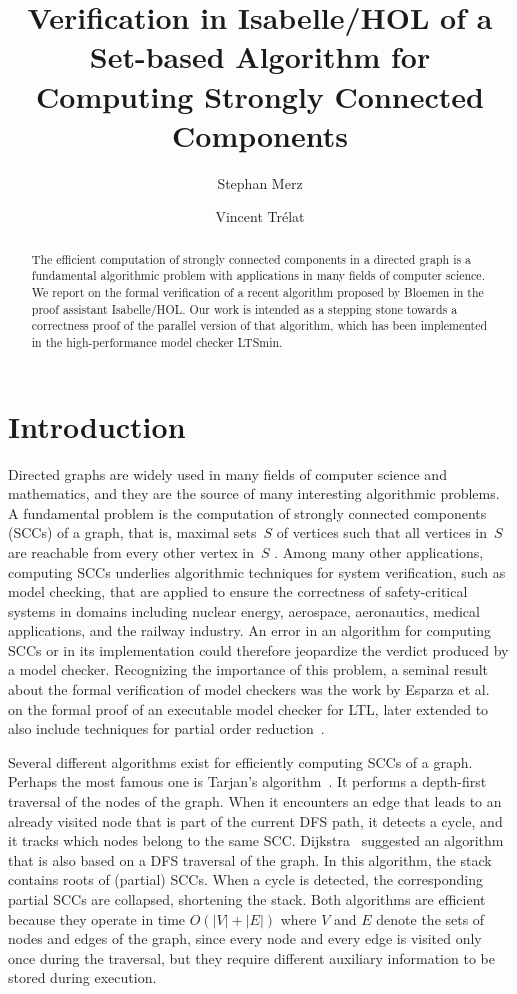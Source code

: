 \documentclass[sigplan,10pt,anonymous,review]{acmart}
\title{Verification in Isabelle/HOL of a Set-based Algorithm for Computing Strongly Connected Components}
\author{Stephan Merz}
\affiliation{
  \institution{University of Lorraine, CNRS, Inria, LORIA}
  \city{Nancy}
  \country{France}
}
\author{Vincent Trélat}
\affiliation{
  \institution{University of Lorraine}
  \city{Nancy}
  \country{France}
}
\begin{document}
\begin{abstract}
  The efficient computation of strongly connected components in a directed graph is a fundamental algorithmic problem with applications in many fields of computer science. We report on the formal verification of a recent algorithm proposed by Bloemen in the proof assistant Isabelle/HOL. Our work is intended as a stepping stone towards a correctness proof of the parallel version of that algorithm, which has been implemented in the high-performance model checker LTSmin.
\end{abstract}

\maketitle

\section{Introduction}
\label{sec:introduction}

Directed graphs are widely used in many fields of computer science and mathematics, and they are the source of many interesting algorithmic problems. A fundamental problem is the computation of strongly connected components (SCCs) of a graph, that is, maximal sets~$S$ of vertices such that all vertices in~$S$ are reachable from every other vertex in~$S$ \cite[Chap.~4.2]{sedgewick:algorithms}. Among many other applications, computing SCCs underlies algorithmic techniques for system verification, such as model checking, that are applied to ensure the correctness of safety-critical systems in domains including nuclear energy, aerospace, aeronautics, medical applications, and the railway industry. An error in an algorithm for computing SCCs or in its implementation could therefore jeopardize the verdict produced by a model checker. Recognizing the importance of this problem, a seminal result about the formal verification of model checkers was the work by Esparza et al.~\cite{esparza:cava} on the formal proof of an executable model checker for LTL, later extended to also include techniques for partial order reduction~\cite{brunner:partial-order}.

Several different algorithms exist for efficiently computing SCCs of a graph. Perhaps the most famous one is Tarjan's algorithm~\cite{tarjan:depth-first}. It performs a depth-first traversal of the nodes of the graph. When it encounters an edge that leads to an already visited node that is part of the current DFS path, it detects a cycle, and it tracks
which nodes belong to the same SCC. Dijkstra~\cite{dijkstra:finding} suggested an algorithm that is also based on a DFS traversal of the graph. In this algorithm, the stack contains roots of (partial) SCCs. When a cycle is detected, the corresponding partial SCCs are collapsed, shortening the stack. Both algorithms are efficient because they operate in time $O(|V|+|E|)$ where $V$ and $E$ denote the sets of nodes and edges of the graph, since every node and every edge is visited only once during the traversal, but they require different auxiliary information to be stored during execution.
\end{document}
